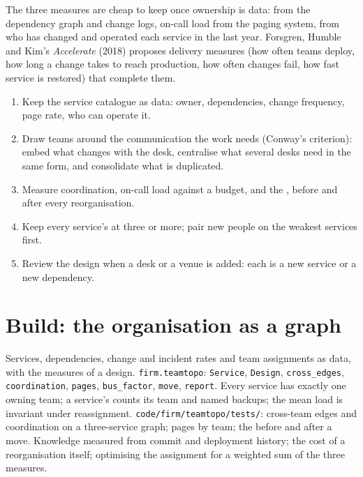 The three measures are cheap to keep once ownership is data:  from the dependency graph and change logs, on-call load from the
paging system,  from who has changed and operated each service in the last year. Forsgren, Humble and Kim's \emph{Accelerate} (2018)
proposes delivery measures (how often teams deploy, how long a change takes to reach production, how often changes fail, how fast service is
restored) that complete them.

\begin{method}\label{met:fm:engineering-organisation-design:design}
\begin{enumerate}
\item Keep the service catalogue as data: owner, dependencies, change frequency, page rate, who can operate it.
\item Draw teams around the communication the work needs (Conway's criterion): embed what changes with the desk, centralise what several desks
need in the same form, and consolidate what is duplicated.
\item Measure coordination, on-call load against a budget, and the , before and after every reorganisation.
\item Keep every service's  at three or more; pair new people on the weakest services first.
\item Review the design when a desk or a venue is added: each is a new service or a new dependency.
\end{enumerate}
\end{method}

\section{Build: the organisation as a graph}\label{bld:fm:engineering-organisation-design:teamtopo}

\begin{build}
 Services, dependencies, change and incident rates and team assignments as data, with the measures of a design.
 \texttt{firm.teamtopo}: \texttt{Service}, \texttt{Design}, \texttt{cross\_edges}, \texttt{coordination}, \texttt{pages},
\texttt{bus\_factor}, \texttt{move}, \texttt{report}.
 Every service has exactly one owning team; a service's  counts its team and named backups; the mean load is invariant
under reassignment.
 \texttt{code/firm/teamtopo/tests/}: cross-team edges and coordination on a three-service graph; pages by team; the  before and after a move.
 Knowledge measured from commit and deployment history; the cost of a reorganisation itself; optimising the assignment for a
weighted sum of the three measures.
\end{build}


